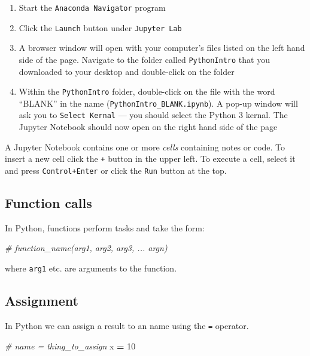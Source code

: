 \documentclass[]{book}
\newenvironment{Shaded}{\begin{snugshade}}{\end{snugshade}}
\newcommand{\DecValTok}[1]{\textcolor[rgb]{0.00,0.00,0.81}{#1}}
\newcommand{\CommentTok}[1]{\textcolor[rgb]{0.56,0.35,0.01}{\textit{#1}}}
\newcommand{\OperatorTok}[1]{\textcolor[rgb]{0.81,0.36,0.00}{\textbf{#1}}}
\newcommand{\NormalTok}[1]{#1}
\providecommand{\tightlist}{%
  \setlength{\itemsep}{0pt}\setlength{\parskip}{0pt}}
\begin{document}
\begin{enumerate}
\def\labelenumi{\arabic{enumi}.}
\tightlist
\item
  Start the \texttt{Anaconda\ Navigator} program
\item
  Click the \texttt{Launch} button under \texttt{Jupyter\ Lab}
\item
  A browser window will open with your computer's files listed on the
  left hand side of the page. Navigate to the folder called
  \texttt{PythonIntro} that you downloaded to your desktop and
  double-click on the folder
\item
  Within the \texttt{PythonIntro} folder, double-click on the file with
  the word ``BLANK'' in the name (\texttt{PythonIntro\_BLANK.ipynb}). A
  pop-up window will ask you to \texttt{Select\ Kernal} --- you should
  select the Python 3 kernal. The Jupyter Notebook should now open on
  the right hand side of the page
\end{enumerate}

A Jupyter Notebook contains one or more \emph{cells} containing notes or
code. To insert a new cell click the \texttt{+} button in the upper
left. To execute a cell, select it and press \texttt{Control+Enter} or
click the \texttt{Run} button at the top.

\subsection{Function calls}\label{function-calls-1}

In Python, functions perform tasks and take the form:

\begin{Shaded}
\begin{Highlighting}[]
\CommentTok{# function_name(arg1, arg2, arg3, ... argn)}
\end{Highlighting}
\end{Shaded}

where \texttt{arg1} etc. are arguments to the function.

\subsection{Assignment}\label{assignment-1}

In Python we can assign a result to an name using the \texttt{=}
operator.

\begin{Shaded}
\begin{Highlighting}[]
\CommentTok{# name = thing_to_assign}
\NormalTok{x }\OperatorTok{=} \DecValTok{10}
\end{Highlighting}
\end{Shaded}
\end{document}

